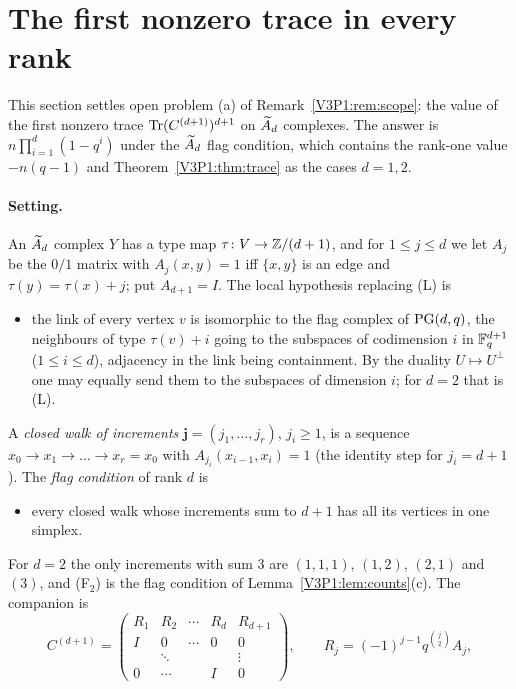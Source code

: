 \section{The first nonzero trace in every rank}\label{V3P1:sec:tracead}

This section settles open problem (a) of Remark~\ref{V3P1:rem:scope}: the value of the first
nonzero trace $\operatorname{Tr}(C^{(d+1)})^{d+1}$ on $\widetilde A_{d}$ complexes. The answer is
$n\prod_{i=1}^{d}(1-q^{i})$ under the $\widetilde A_{d}$ flag condition, which contains the rank-one value
$-n(q-1)$ and Theorem~\ref{V3P1:thm:trace} as the cases $d=1,2$.

\paragraph{Setting.} An $\widetilde A_{d}$ complex $Y$ has a type map $\tau\colon V\to\mathbb{Z}/(d+1)$, and for
$1\le j\le d$ we let $A_j$ be the $0/1$ matrix with $A_j(x,y)=1$ iff $\{x,y\}$ is an edge and
$\tau(y)=\tau(x)+j$; put $A_{d+1}=I$. The local hypothesis replacing (L) is
\begin{itemize}
\item[(L$_d$)] the link of every vertex $v$ is isomorphic to the flag complex of $\mathrm{PG}(d,q)$, the
neighbours of type $\tau(v)+i$ going to the subspaces of codimension $i$ in $\mathbb{F}_q^{d+1}$
($1\le i\le d$), adjacency in the link being containment. By the duality $U\mapsto U^{\perp}$ one
may equally send them to the subspaces of dimension $i$; for $d=2$ that is \textup{(L)}.
\end{itemize}
A \emph{closed walk of increments} $\mathbf j=(j_1,\dots,j_r)$, $j_i\ge1$, is a sequence
$x_0\to x_1\to\dots\to x_r=x_0$ with $A_{j_i}(x_{i-1},x_i)=1$ (the identity step for $j_i=d+1$). The
\emph{flag condition} of rank $d$ is
\begin{itemize}
\item[(F$_d$)] every closed walk whose increments sum to $d+1$ has all its vertices in one simplex.
\end{itemize}
For $d=2$ the only increments with sum $3$ are $(1,1,1)$, $(1,2)$, $(2,1)$ and $(3)$, and (F$_2$) is the
flag condition of Lemma~\ref{V3P1:lem:counts}(c). The companion is
\[
C^{(d+1)}=\begin{pmatrix}
R_1&R_2&\cdots&R_d&R_{d+1}\\ I&0&\cdots&0&0\\ &\ddots&&&\vdots\\ 0&\cdots&&I&0\end{pmatrix},
\qquad R_j=(-1)^{j-1}q^{\binom j2}A_j ,
\]
